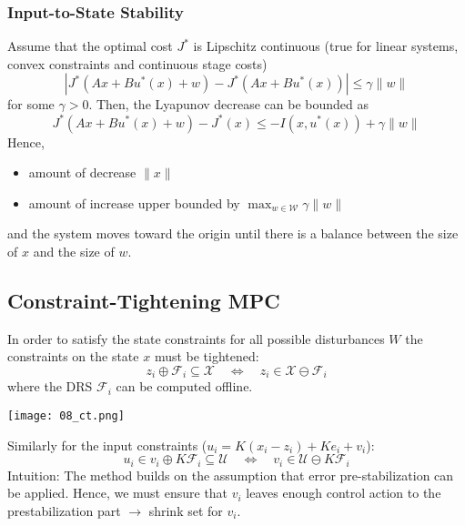 \subsubsection{Input-to-State Stability}
Assume that the optimal cost $J^*$ is Lipschitz continuous (true for linear systems, convex constraints and continuous stage costs)
\begin{equation*}
    |J^*(A x + B u^*(x) + w) - J^*(A x + B u^*(x))| \leq \gamma \|w\|
\end{equation*}
for some $\gamma > 0$.
\newpar{}
Then, the Lyapunov decrease can be bounded as
\begin{equation*}
    J^*(A x + B u^*(x) + w) - J^*(x)\leq -I(x, u^*(x)) + \gamma \|w\|
\end{equation*}
Hence,
\begin{itemize}
    \item amount of decrease $\|x\|$
    \item amount of increase upper bounded by $\max_{w \in \mathcal{W}} \gamma \|w\|$
\end{itemize}
and the system moves toward the origin until there is a balance between the size of $x$ and the size of $w$.

\subsection{Constraint-Tightening MPC}

In order to satisfy the state constraints for all possible disturbances $W$ the constraints on the state $x$ must be tightened:
\begin{equation*}
    z_i \oplus \mathcal{F}_i \subseteq \mathcal{X} \quad \Leftrightarrow \quad z_i \in \mathcal{X}\ominus \mathcal{F}_i
\end{equation*}
where the DRS $\mathcal{F}_i$ can be computed offline.

\begin{center}
    \texttt{[image: 08\_ct.png]}
\end{center}

\newpar{}
Similarly for the input constraints ($u_i = K(x_i - z_i) + K e_i + v_i$): %
\begin{equation*}
    u_i \in v_i \oplus K \mathcal{F}_i \subseteq \mathcal{U}\quad \Leftrightarrow \quad v_i \in \mathcal{U} \ominus K\mathcal{F}_i
\end{equation*}
Intuition: The method builds on the assumption that error pre-stabilization can be applied. Hence, we must ensure that $v_i$ leaves enough control action to the prestabilization part $\rightarrow$ shrink set for $v_i$.

